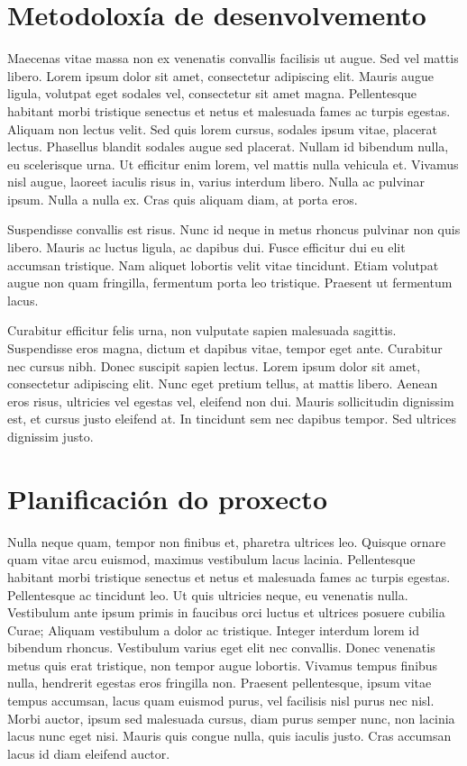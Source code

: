 \documentclass{pfc}
\begin{document}
\section{Metodoloxía de desenvolvemento}

Maecenas vitae massa non ex venenatis convallis facilisis ut
augue. Sed vel mattis libero. Lorem ipsum dolor sit amet, consectetur
adipiscing elit. Mauris augue ligula, volutpat eget sodales vel,
consectetur sit amet magna. Pellentesque habitant morbi tristique
senectus et netus et malesuada fames ac turpis egestas. Aliquam non
lectus velit. Sed quis lorem cursus, sodales ipsum vitae, placerat
lectus. Phasellus blandit sodales augue sed placerat. Nullam id
bibendum nulla, eu scelerisque urna. Ut efficitur enim lorem, vel
mattis nulla vehicula et. Vivamus nisl augue, laoreet iaculis risus
in, varius interdum libero. Nulla ac pulvinar ipsum. Nulla a nulla
ex. Cras quis aliquam diam, at porta eros.

Suspendisse convallis est risus. Nunc id neque in metus rhoncus
pulvinar non quis libero. Mauris ac luctus ligula, ac dapibus
dui. Fusce efficitur dui eu elit accumsan tristique. Nam aliquet
lobortis velit vitae tincidunt. Etiam volutpat augue non quam
fringilla, fermentum porta leo tristique. Praesent ut fermentum lacus.

Curabitur efficitur felis urna, non vulputate sapien malesuada
sagittis. Suspendisse eros magna, dictum et dapibus vitae, tempor eget
ante. Curabitur nec cursus nibh. Donec suscipit sapien lectus. Lorem
ipsum dolor sit amet, consectetur adipiscing elit. Nunc eget pretium
tellus, at mattis libero. Aenean eros risus, ultricies vel egestas
vel, eleifend non dui. Mauris sollicitudin dignissim est, et cursus
justo eleifend at. In tincidunt sem nec dapibus tempor. Sed ultrices
dignissim justo.


\section{Planificación do proxecto}

Nulla neque quam, tempor non finibus et, pharetra ultrices
leo. Quisque ornare quam vitae arcu euismod, maximus vestibulum lacus
lacinia. Pellentesque habitant morbi tristique senectus et netus et
malesuada fames ac turpis egestas. Pellentesque ac tincidunt leo. Ut
quis ultricies neque, eu venenatis nulla. Vestibulum ante ipsum primis
in faucibus orci luctus et ultrices posuere cubilia Curae; Aliquam
vestibulum a dolor ac tristique. Integer interdum lorem id bibendum
rhoncus. Vestibulum varius eget elit nec convallis. Donec venenatis
metus quis erat tristique, non tempor augue lobortis. Vivamus tempus
finibus nulla, hendrerit egestas eros fringilla non. Praesent
pellentesque, ipsum vitae tempus accumsan, lacus quam euismod purus,
vel facilisis nisl purus nec nisl. Morbi auctor, ipsum sed malesuada
cursus, diam purus semper nunc, non lacinia lacus nunc eget
nisi. Mauris quis congue nulla, quis iaculis justo. Cras accumsan
lacus id diam eleifend auctor.
\end{document}
